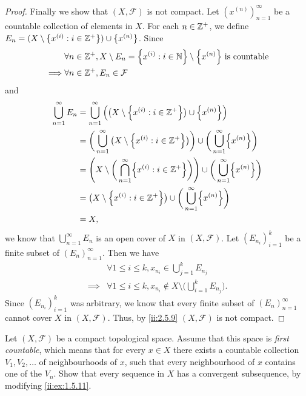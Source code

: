 \begin{proof}
  Finally we show that \((X, \mathcal{F})\) is not compact.
  Let \((x^{(n)})_{n = 1}^\infty\) be a countable collection of elements in \(X\).
  For each \(n \in \mathbb{Z}^+\), we define \(E_n = (X \setminus \left\lbrace x^{(i)} : i \in \mathbb{Z}^+\right\rbrace) \cup \left\lbrace x^{(n)}\right\rbrace\).
  Since
  \begin{align*}
             & \forall n \in \Z^+, X \setminus E_n = \set{x^{(i)} : i \in \N} \setminus \set{x^{(n)}} \text{ is countable} \\
    \implies & \forall n \in \Z^+, E_n \in \mathcal{F}
  \end{align*}
  and
  \begin{align*}
    \bigcup_{n = 1}^\infty E_n & = \bigcup_{n = 1}^\infty \Big(\big(X \setminus \set{x^{(i)} : i \in \Z^+}\big) \cup \set{x^{(n)}}\Big)                                        \\
                               & = \bigg(\bigcup_{n = 1}^\infty \big(X \setminus \set{x^{(i)} : i \in \Z^+}\big)\bigg) \cup \bigg(\bigcup_{n = 1}^\infty \set{x^{(n)}}\bigg)   \\
                               & = \Bigg(X \setminus \bigg(\bigcap_{n = 1}^\infty \set{x^{(i)} : i \in \Z^+}\bigg)\Bigg) \cup \bigg(\bigcup_{n = 1}^\infty \set{x^{(n)}}\bigg) \\
                               & = \big(X \setminus \set{x^{(i)} : i \in \Z^+}\big) \cup \bigg(\bigcup_{n = 1}^\infty \set{x^{(n)}}\bigg)                                      \\
                               & = X,
  \end{align*}
  we know that \(\bigcup_{n = 1}^\infty E_n\) is an open cover of \(X\) in \((X, \mathcal{F})\).
  Let \((E_{n_i})_{i = 1}^k\) be a finite subset of \((E_n)_{n = 1}^\infty\).
  Then we have
  \begin{align*}
             & \forall 1 \leq i \leq k, x_{n_i} \in \bigcup_{j = 1}^k E_{n_j}                             \\
    \implies & \forall 1 \leq i \leq k, x_{n_i} \notin X \setminus \bigg(\bigcup_{i = 1}^k E_{n_j}\bigg).
  \end{align*}
  Since \((E_{n_i})_{i = 1}^k\) was arbitrary, we know that every finite subset of \((E_n)_{n = 1}^\infty\) cannot cover \(X\) in \((X, \mathcal{F})\).
  Thus, by \cref{ii:2.5.9} \((X, \mathcal{F})\) is not compact.
\end{proof}

\setcounter{ex}{8}
\begin{ex}\label{ii:ex:2.5.9}
  Let \((X, \mathcal{F})\) be a compact topological space.
  Assume that this space is \emph{first countable}, which means that for every \(x \in X\) there exists a countable collection \(V_1 , V_2 , \dots\) of neighbourhoods of \(x\), such that every neighbourhood of \(x\) contains one of the \(V_n\).
  Show that every sequence in \(X\) has a convergent subsequence, by modifying \cref{ii:ex:1.5.11}.
\end{ex}

